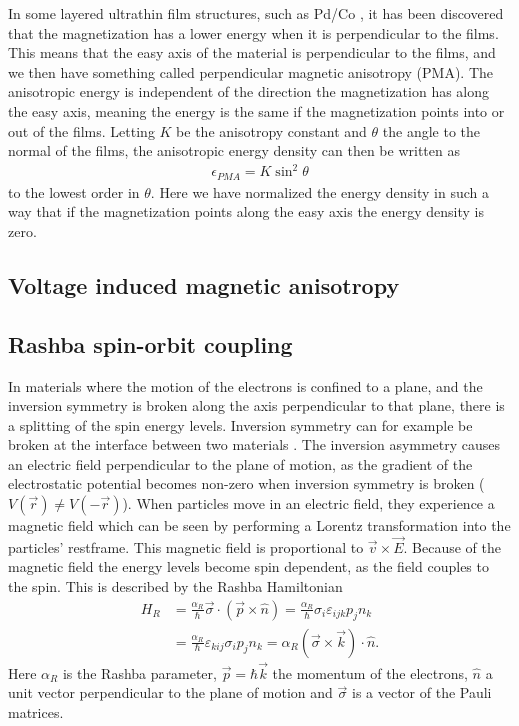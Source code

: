 \documentclass[12pt, a4paper, twoside, openright]{article}		%
\numberwithin{equation}{section}
\begin{document}
In some layered ultrathin film structures, such as Pd/Co \cite{Carcia1985}, it has been discovered that the magnetization has a lower energy when it is perpendicular to the films. This means that the easy axis of the material is perpendicular to the films, and we then have something called perpendicular magnetic anisotropy (PMA). The anisotropic energy is independent of the direction the magnetization has along the easy axis, meaning the energy is the same if the magnetization points into or out of the films. Letting $K$ be the anisotropy constant and $\theta$ the angle to the normal of the films, the anisotropic energy density can then be written as
\begin{align}
\epsilon_{PMA} = K\sin^2\theta \label{eq:PMADensity}
\end{align} 
to the lowest order in $\theta$. Here we have normalized the energy density in such a way that if the magnetization points along the easy axis the energy density is zero.
\subsection{Voltage induced magnetic anisotropy}
\subsection{Rashba spin-orbit coupling}
In materials where the motion of the electrons is confined to a plane, and the inversion symmetry is broken along the axis perpendicular to that plane, there is a splitting of the spin energy levels. Inversion symmetry can for example be broken at the interface between two materials \cite{Heide2006}. The inversion asymmetry causes an electric field perpendicular to the plane of motion, as the gradient of the electrostatic potential becomes non-zero when inversion symmetry is broken ($V(\vec{r}) \neq V(-\vec{r})$). When particles move in an electric field, they experience a magnetic field which can be seen by performing a Lorentz transformation into the particles' restframe. This magnetic field is proportional to $\vec{v}\times\vec{E}$. Because of the magnetic field the energy levels become spin dependent, as the field couples to the spin. This is described by the Rashba Hamiltonian \citep{BychovRashba1984}
\begin{align}
H_R &= \frac{\alpha_R}{\hbar}\vec{\sigma}\cdot(\vec{p}\times\hat{n}) = \frac{\alpha_R}{\hbar}\sigma_i\varepsilon_{ijk}p_jn_k \\
&= \frac{\alpha_R}{\hbar}\varepsilon_{kij}\sigma_ip_jn_k = \alpha_R (\vec{\sigma}\times\vec{k})\cdot\hat{n}.
\end{align}
Here $\alpha_R$ is the Rashba parameter, $\vec{p} = \hbar\vec{k}$ the momentum of the electrons, $\hat{n}$ a unit vector perpendicular to the plane of motion and $\vec{\sigma}$ is a vector of the Pauli matrices.
\end{document}
